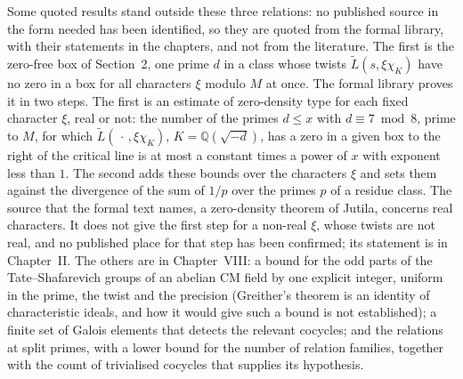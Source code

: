 Some quoted results stand outside these three relations: no published source in the form needed has been
identified, so they are quoted from the formal library, with their statements in the chapters, and not from the
literature. The first is the zero-free box of Section~2, one prime $d$ in a class
whose twists $\tilde L(s,\xi\chi_K)$ have no zero in a box for all characters $\xi$ modulo $M$ at once. The formal
library proves it in two steps. The first is an estimate of zero-density type for each fixed character $\xi$,
real or not: the number of the primes $d\le x$ with $d\equiv7\bmod8$, prime to $M$, for which
$\tilde L(\,\cdot\,,\xi\chi_K)$, $K=\mathbb{Q}(\sqrt{-d})$, has a zero in a given box to the right of the critical
line is at most a constant times a power of $x$ with exponent less than $1$. The second adds these bounds over the characters $\xi$ and sets
them against the divergence of the sum of $1/p$ over the primes $p$ of a residue class. The source that the formal
text names, a zero-density theorem of Jutila, concerns real characters. It does not give the first step for a
non-real $\xi$, whose twists are not real, and no published place for that step has been confirmed; its statement is
in Chapter~II. The others are in Chapter~VIII: a bound for the odd parts of the Tate--Shafarevich groups of an
abelian CM field by one explicit integer, uniform in the prime, the twist and the precision (Greither's theorem is an
identity of characteristic ideals, and how it would give such a bound is not established); a finite set of Galois
elements that detects the relevant cocycles; and the relations at split primes, with a lower bound for the number of
relation families, together with the count of trivialised cocycles that supplies its hypothesis.


